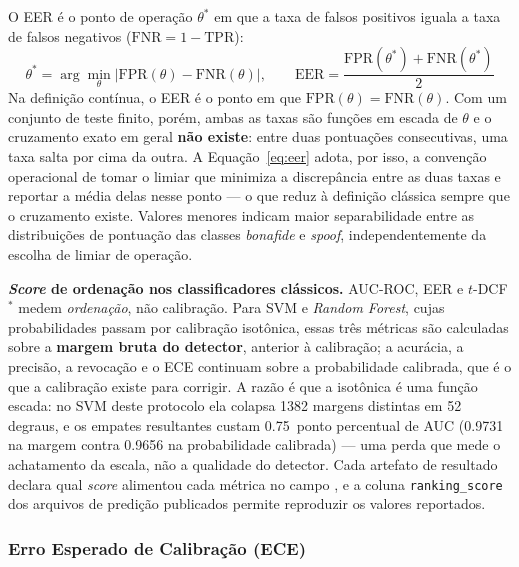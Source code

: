 \documentclass[12pt,a4paper]{article}
\begin{document}
O EER é o ponto de operação $\theta^\ast$ em que a taxa de falsos positivos
iguala a taxa de falsos negativos ($\mathrm{FNR} = 1 - \mathrm{TPR}$):
\begin{equation}
	\label{eq:eer}
	\theta^\ast = \arg\min_{\theta} \big| \mathrm{FPR}(\theta) - \mathrm{FNR}(\theta) \big|,
	\qquad
	\text{EER} = \frac{\mathrm{FPR}(\theta^\ast) + \mathrm{FNR}(\theta^\ast)}{2}
\end{equation}
\noindent
Na definição contínua, o EER é o ponto em que $\mathrm{FPR}(\theta) = \mathrm{FNR}(\theta)$. Com
um conjunto de teste finito, porém, ambas as taxas são funções em escada de
$\theta$ e o cruzamento exato em geral \textbf{não existe}: entre duas
pontuações consecutivas, uma taxa salta por cima da outra. A
Equação~\ref{eq:eer} adota, por isso, a convenção operacional de tomar o limiar
que minimiza a discrepância entre as duas taxas e reportar a média delas nesse
ponto --- o que reduz à definição clássica sempre que o cruzamento existe.
Valores menores indicam maior separabilidade entre as distribuições de
pontuação das classes \textit{bonafide} e \textit{spoof}, independentemente da
escolha de limiar de operação.

\par\textbf{\textit{Score} de ordenação nos classificadores clássicos.} AUC-ROC, EER e
$t$-DCF$^\ast$ medem \emph{ordenação}, não calibração. Para SVM e \textit{Random
	Forest}, cujas probabilidades passam por calibração isotônica, essas três
métricas são calculadas sobre a \textbf{margem bruta do detector}, anterior à
calibração; a acurácia, a precisão, a revocação e o ECE continuam sobre a
probabilidade calibrada, que é o que a calibração existe para corrigir. A razão
é que a isotônica é uma função escada: no SVM deste protocolo ela colapsa
\num{1382} margens distintas em \num{52} degraus, e os empates resultantes
custam \num{0,75}~ponto percentual de AUC (\num{0,9731} na margem contra
\num{0,9656} na probabilidade calibrada) --- uma perda que mede o achatamento
da escala, não a qualidade do detector. Cada artefato de resultado declara qual
\textit{score} alimentou cada métrica no campo , e a
coluna \texttt{ranking\_score} dos arquivos de predição publicados permite
reproduzir os valores reportados.

\subsubsection*{Erro Esperado de Calibração (ECE)}
\label{sec:ece_def}
\end{document}
